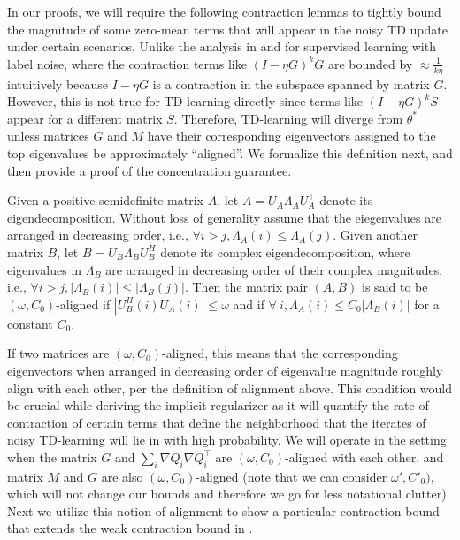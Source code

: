 In our proofs, we will require the following contraction lemmas to tightly bound the magnitude of some zero-mean terms that will appear in the noisy TD update under certain scenarios. Unlike the analysis in \citet{damian2021label} and \citet{blanc2020implicit} for supervised learning with label noise, where the contraction terms like $(I - \eta G)^k G$ are bounded by $\approx \frac{1}{k \eta}$ intuitively because $I - \eta G$ is a contraction in the subspace spanned by matrix $G$. However, this is not true for TD-learning directly since terms like $(I - \eta G)^k S$ appear for a different matrix $S$. Therefore, TD-learning will diverge from $\theta^*$ unless matrices $G$ and $M$ have their corresponding eigenvectors assigned to the top eigenvalues be approximately ``aligned''. We formalize this definition next, and then provide a proof of the concentration guarantee. 

\begin{definition}
\label{def:alignment}
Given a positive semidefinite matrix $A$, let $A = U_A \Lambda_A U_A^\top$ denote its eigendecomposition. Without loss of generality assume that the eiegenvalues are arranged in decreasing order, i.e., $\forall i > j, \Lambda_A(i) \leq \Lambda_A(j)$. Given another matrix $B$, let $B = U_B \Lambda_B U_B^H$ denote its complex eigendecomposition, where eigenvalues in $\Lambda_B$ are arranged in decreasing order of their complex magnitudes, i.e., $\forall i > j, |\Lambda_B(i)| \leq |\Lambda_B(j)|$. Then the matrix pair $(A, B)$ is said to be $(\omega, C_0)$-aligned if $|U_B^H(i) U_A(i)| \leq \omega$ and if $\forall~ i, \Lambda_A(i) \leq C_0 |\Lambda_B(i)|$ for a constant $C_0$. 
\end{definition}
If two matrices are $(\omega, C_0)$-aligned, this means that the corresponding eigenvectors when arranged in decreasing order of eigenvalue magnitude roughly align with each other, per the definition of alignment above. This condition would be crucial while deriving the implicit regularizer as it will quantify the rate of contraction of certain terms that define the neighborhood that the iterates of noisy TD-learning will lie in with high probability. We will operate in the setting when the matrix $G$ and $\sum_i \nabla Q_i \nabla Q_i^\top$ are $(\omega, C_0)$-aligned with each other, and matrix $M$ and $G$ are also $(\omega, C_0)$-aligned (note that we can consider $\omega', C'_0)$, which will not change our bounds and therefore we go for less notational clutter). Next we utilize this notion of alignment to show a particular contraction bound that extends the weak contraction bound in \citet{damian2021label}.  


